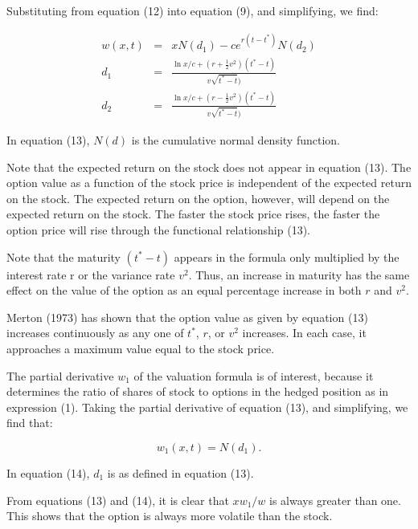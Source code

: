 \documentclass[a4paper, 12pt, twoside]{article}
\begin{document}
\vspace*{3mm}
Substituting from equation (12) into equation (9), and simplifying, we find:

\begin{eqnarray}
w(x,t) &=& xN(d_1)-ce^{r(t-t^*)} N(d_2) \nonumber \\
d_1&=& \frac{\ln x/c+(r+\displaystyle \frac{1}{2} v^2)(t^*-t)}{v\sqrt{t^*-t})} \\
d_2&=& \frac{\ln x/c+(r-\displaystyle \frac{1}{2} v^2)(t^*-t)}{v\sqrt{t^*-t})} \nonumber
\end{eqnarray}

\vspace*{3mm}
\noindent In equation (13), $N(d)$ is the cumulative normal density function.

Note that the expected return on the stock does not appear in equation (13). The 
option value as a function of the stock price is independent of the expected return on 
the stock. The expected return on the option, however, will depend on the expected 
return on the stock. The faster the stock price rises, the faster the option price 
will rise through the functional relationship (13).

Note that the maturity $(t^*-t)$ appears in the formula only multiplied by the interest 
rate r or the variance rate $v^2$. Thus, an increase in maturity has the same effect on 
the value of the option as an equal percentage increase in both $r$ and $v^2$.

Merton (1973) has shown that the option value as given by equation (13) increases 
continuously as any one of $t^*$, $r$, or $v^2$ increases. In each case, it approaches a 
maximum value equal to the stock price.

The partial derivative $w_1$ of the valuation formula is of interest, because it 
determines the ratio of shares of stock to options in the hedged position as in 
expression (1). Taking the partial derivative of equation (13), and simplifying, we 
find that:

\begin{equation}
w_1(x,t)=N(d_1).
\end{equation}

\vspace*{1mm}
\noindent In equation (14), $d_1$ is as defined in equation (13).

From equations (13) and (14), it is clear that $xw_1/w$ is always greater than one. This 
shows that the option is always more volatile than the stock.
\end{document}

